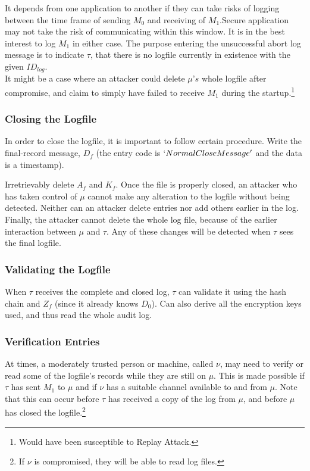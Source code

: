\documentclass[12pt, letter]{article}
\begin{document}
It depends from one application to another if they can take risks of logging between the time frame of sending $M_0$ and receiving of $M_1$.Secure application may not take the risk of communicating within this window. It is in the best interest to log $M_1$ in either case. The purpose entering the unsuccessful abort log message is to indicate $\tau$, that there is no logfile currently in existence with the given $ID_{log}$.\\

It might be a case where an attacker could delete $\mu’s$ whole logfile after compromise, and claim to simply have failed to receive $M_1$ during the startup.\footnote{Would have been susceptible to Replay Attack.}

\subsubsection{Closing the Logfile}

In order to close the logfile, it is important to follow certain procedure. Write the final-record message, $D_f$ (the entry code is $`NormalCloseMessage'$ and the data is a timestamp).

Irretrievably delete $A_f$ and $K_f$. Once the file is properly closed, an attacker who has taken control of $\mu$ cannot make any alteration to the logfile without being detected. Neither can an attacker delete entries nor add others earlier in the log. Finally, the attacker cannot delete the whole log file, because of the earlier interaction between $\mu$ and $\tau$. Any of these changes will be detected when $\tau$ sees the final logfile.

\subsubsection{Validating the Logfile}
When $\tau$ receives the complete and closed log, $\tau$ can validate it using the hash chain and $Z_f$ (since it already knows $D_0$). Can also derive all the encryption keys used, and thus read the whole audit log.

\subsubsection{Verification Entries}

At times, a moderately trusted person or machine, called $\nu$, may need to verify or read some of the logfile’s records while they are still on $\mu$. This is made possible if $\tau$ has sent $M_1$ to $\mu$ and if $\nu$ has a suitable channel available to and from $\mu$. Note that this can occur before $\tau$ has received a copy of the log from $\mu$, and before $\mu$ has closed the logfile.\footnote{If $\nu$ is compromised, they will be able to read log files.}
\end{document}
